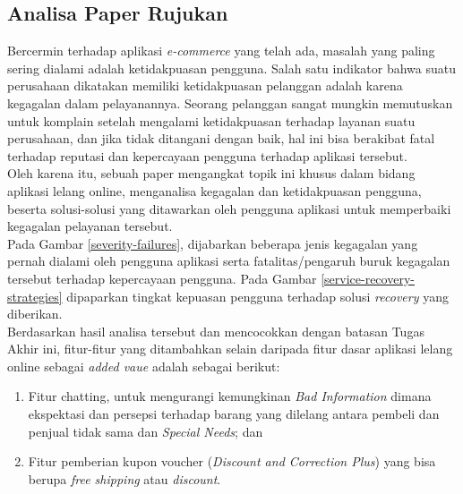 
    \subsection{Analisa Paper Rujukan}
	    \label{analisa-paper-rujukan}
		\indent Bercermin terhadap aplikasi \textit{e-commerce} yang telah ada, masalah yang paling sering dialami adalah ketidakpuasan pengguna. Salah satu indikator bahwa suatu perusahaan dikatakan memiliki ketidakpuasan pelanggan adalah karena kegagalan dalam pelayanannya. Seorang pelanggan sangat mungkin memutuskan untuk komplain setelah mengalami ketidakpuasan terhadap layanan suatu perusahaan, dan jika tidak ditangani dengan baik, hal ini bisa berakibat fatal terhadap reputasi dan kepercayaan pengguna terhadap aplikasi tersebut. \\
		\indent Oleh karena itu, sebuah paper mengangkat topik ini khusus dalam bidang aplikasi lelang online, menganalisa kegagalan dan ketidakpuasan pengguna, beserta solusi-solusi yang ditawarkan oleh pengguna aplikasi untuk memperbaiki kegagalan pelayanan tersebut. \\
		\indent Pada Gambar \ref{severity-failures}, dijabarkan beberapa jenis kegagalan yang pernah dialami oleh pengguna aplikasi serta fatalitas/pengaruh buruk kegagalan tersebut terhadap kepercayaan pengguna. Pada Gambar \ref{service-recovery-strategies} dipaparkan tingkat kepuasan pengguna terhadap solusi \textit{recovery} yang diberikan.\\ 
		\indent Berdasarkan hasil analisa tersebut dan mencocokkan dengan batasan Tugas Akhir ini, fitur-fitur yang ditambahkan selain daripada fitur dasar aplikasi lelang online sebagai \textit{added vaue} adalah sebagai berikut:
		\begin{enumerate}
			\item Fitur chatting, untuk mengurangi kemungkinan \textit{Bad Information} dimana ekspektasi dan persepsi terhadap barang yang dilelang antara pembeli dan penjual tidak sama dan \textit{Special Needs}; dan
			\item Fitur pemberian kupon voucher (\textit{Discount and Correction Plus}) yang bisa berupa \textit{free shipping} atau \textit{discount}.
		\end{enumerate}
		

